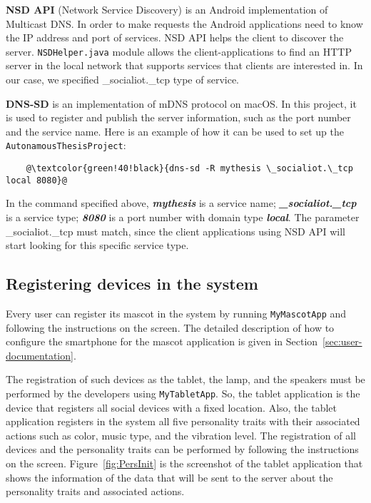 \textbf{NSD API} (Network Service Discovery) is an Android implementation of Multicast DNS\@.
In order to make requests the Android applications need to know the IP address and port of services.
NSD API helps the client to discover the server.
\texttt{NSDHelper.java} module allows the client-applications to find an HTTP server in the local network that supports
services that clients are interested in.
In our case, we specified \_socialiot.\_tcp type of service.

\textbf{DNS-SD} is an implementation of mDNS protocol on macOS\@.
In this project, it is used to register and publish the server information, such as the port number and the service name.
Here is an example of how it can be used to set up the \texttt{AutonamousThesisProject}:
\begin{lstlisting}
    @\textcolor{green!40!black}{dns-sd -R mythesis \_socialiot.\_tcp local 8080}@
\end{lstlisting}
In the command specified above, \textbf{\emph{mythesis}} is a service name;
\textbf{\emph{\_socialiot.\_tcp}} is a service type;
\textbf{\emph{8080}} is a port number with domain type \textbf{\emph{local}}.
The parameter \_socialiot.\_tcp must match, since the client applications using NSD API
will start looking for this specific service type.

\subsection{Registering devices in the system}
\label{subsec:registering-devices-in-the-system.}
Every user can register its mascot in the system by running \texttt{MyMascotApp} and following the instructions on the screen.
The detailed description of how to configure the smartphone for the mascot application is given in
Section~\ref{sec:user-documentation}.

The registration of such devices as the tablet, the lamp, and the speakers must be performed
by the developers using \texttt{MyTabletApp}.
So, the tablet application is the device that registers all social devices with a fixed location.
Also, the tablet application registers in the system all five personality traits with their
associated actions such as color, music type, and the vibration level.
The registration of all devices and the personality traits can be performed by following the instructions on the screen.
Figure~\ref{fig:PersInit} is the screenshot of the tablet application that shows the information of the data that will
be sent to the server about the personality traits and associated actions.

